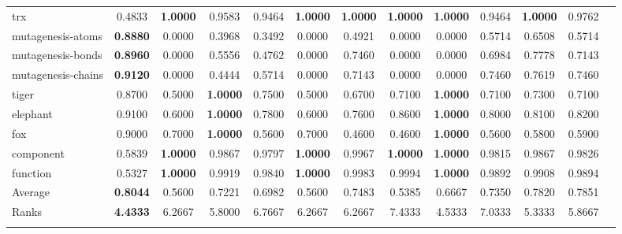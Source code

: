\documentclass[preprint,12pt]{elsarticle}
\begin{document}
\begin{table}[H]
{\begin{tabular}{l@{\extracolsep{\fill}}cccccccccccc}
trx &0.4833 &\textbf{1.0000} &0.9583 &0.9464 &\textbf{1.0000} &\textbf{1.0000} &\textbf{1.0000} &\textbf{1.0000} &0.9464 &\textbf{1.0000} &0.9762 &  \\
mutagenesis-atoms &\textbf{0.8880} &0.0000 &0.3968 &0.3492 &0.0000 &0.4921 &0.0000 &0.0000 &0.5714 &0.6508 &0.5714 &  \\
mutagenesis-bonds &\textbf{0.8960} &0.0000 &0.5556 &0.4762 &0.0000 &0.7460 &0.0000 &0.0000 &0.6984 &0.7778 &0.7143 &  \\
mutagenesis-chains &\textbf{0.9120} &0.0000 &0.4444 &0.5714 &0.0000 &0.7143 &0.0000 &0.0000 &0.7460 &0.7619 &0.7460 &  \\
tiger &0.8700 &0.5000 &\textbf{1.0000} &0.7500 &0.5000 &0.6700 &0.7100 &\textbf{1.0000} &0.7100 &0.7300 &0.7100 &  \\
elephant &0.9100 &0.6000 &\textbf{1.0000} &0.7800 &0.6000 &0.7600 &0.8600 &\textbf{1.0000} &0.8000 &0.8100 &0.8200 &  \\
fox &0.9000 &0.7000 &\textbf{1.0000} &0.5600 &0.7000 &0.4600 &0.4600 &\textbf{1.0000} &0.5600 &0.5800 &0.5900 &  \\
component &0.5839 &\textbf{1.0000} &0.9867 &0.9797 &\textbf{1.0000} &0.9967 &\textbf{1.0000} &\textbf{1.0000} &0.9815 &0.9867 &0.9826 &  \\
function &0.5327 &\textbf{1.0000} &0.9919 &0.9840 &\textbf{1.0000} &0.9983 &0.9994 &\textbf{1.0000} &0.9892 &0.9908 &0.9894 &  \\
\noalign{\smallskip}\hline\noalign{\smallskip}
Average &\textbf{0.8044} &0.5600 &0.7221 &0.6982 &0.5600 &0.7483 &0.5385 &0.6667 &0.7350 &0.7820 &0.7851 &  \\
Ranks &\textbf{4.4333} &6.2667 &5.8000 &6.7667 &6.2667 &6.2667 &7.4333 &4.5333 &7.0333 &5.3333 &5.8667 &  \\
\noalign{\smallskip}\hline
\end{tabular}}
\end{table}
\end{document}
